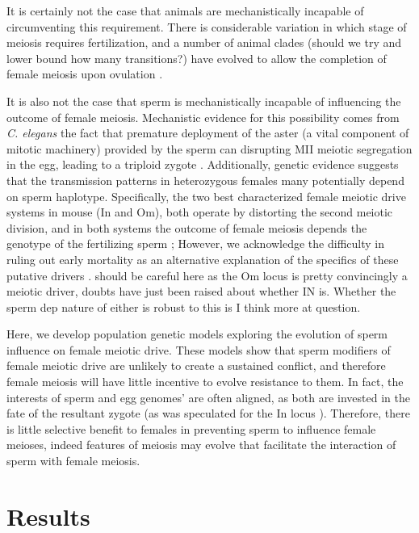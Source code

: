 \documentclass[12pt,letterpaper]{article}
\newcommand{\gc}[1]{{ \color{red} #1}}
\begin{document}
It is certainly not the case that animals are mechanistically incapable of circumventing this requirement.
There is considerable variation in which stage of meiosis requires fertilization, and 
a number of animal clades (should we try and lower bound how many transitions?) have evolved
to allow the completion of female meiosis upon ovulation \citep[see
Table 1 of ][]{Masui_book}. 

It is also not the case that sperm is mechanistically incapable of influencing the outcome of female meiosis.
Mechanistic evidence for this possibility comes from
\emph{C. elegans} the fact that premature deployment of the aster (a vital component of mitotic
machinery) provided by the sperm can disrupting MII meiotic segregation
in the egg, leading to a triploid zygote \citep{McNally2012}. 
Additionally, genetic evidence suggests that the transmission patterns
in heterozygous females many potentially depend on sperm haplotype. 
Specifically, the two best characterized female meiotic drive systems in mouse (In and Om), both operate by distorting the second meiotic division, 
and in both systems the outcome of female meiosis depends the genotype of the fertilizing sperm \citep{Agulnik1993,Wu2005}; 
However,  we acknowledge the difficulty in ruling out early mortality
as an alternative explanation of the 
specifics of these putative drivers \citep[Give page numbers to
discussion of this in][]{Burt2006}. \gc{should be careful here as the
  Om locus is pretty convincingly a meiotic driver, doubts have just
  been raised about whether IN is. Whether the sperm dep nature of
  either is robust to this is I think more at question.}


Here, we develop population genetic models exploring the evolution of sperm influence on female meiotic drive. 
These models show that sperm modifiers of female meiotic drive are
unlikely to create a sustained conflict, and therefore 
female meiosis will have little incentive to evolve resistance to them.
In fact, the interests of sperm and egg  genomes' are often aligned, as both are invested in the fate of the resultant zygote (as was speculated for the In locus \citep{Pomiankowski1993}).
Therefore, there is little selective benefit to females in preventing sperm to influence female meioses,
	indeed features of meiosis may evolve that facilitate the interaction of sperm with female meiosis. 

\section*{Results}
\end{document}
